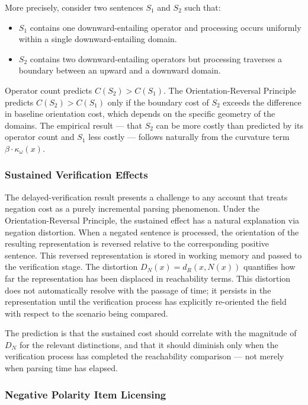 \documentclass[12pt]{article}
\theoremstyle{remark}
\begin{document}
More precisely, consider two sentences $S_1$ and $S_2$ such that:
\begin{itemize}
\item $S_1$ contains one downward-entailing operator and processing
occurs uniformly within a single downward-entailing domain.
\item $S_2$ contains two downward-entailing operators but processing
traverses a boundary between an upward and a downward domain.
\end{itemize}
Operator count predicts $C(S_2) > C(S_1)$. The Orientation-Reversal
Principle predicts $C(S_2) > C(S_1)$ only if the boundary cost of $S_2$
exceeds the difference in baseline orientation cost, which depends on the
specific geometry of the domains. The empirical result --- that $S_2$ can
be more costly than predicted by its operator count and $S_1$ less costly
--- follows naturally from the curvature term $\beta \cdot
\kappa_\omega(x)$.

\subsubsection{Sustained Verification Effects}

The delayed-verification result presents a challenge to any account that
treats negation cost as a purely incremental parsing phenomenon. Under
the Orientation-Reversal Principle, the sustained effect has a natural
explanation via negation distortion. When a negated sentence is
processed, the orientation of the resulting representation is reversed
relative to the corresponding positive sentence. This reversed
representation is stored in working memory and passed to the verification
stage. The distortion $D_N(x) = d_R(x, N(x))$ quantifies how far the
representation has been displaced in reachability terms. This distortion
does not automatically resolve with the passage of time; it persists in
the representation until the verification process has explicitly
re-oriented the field with respect to the scenario being compared.

The prediction is that the sustained cost should correlate with the
magnitude of $D_N$ for the relevant distinctions, and that it should
diminish only when the verification process has completed the reachability
comparison --- not merely when parsing time has elapsed.

\subsubsection{Negative Polarity Item Licensing}
\end{document}
